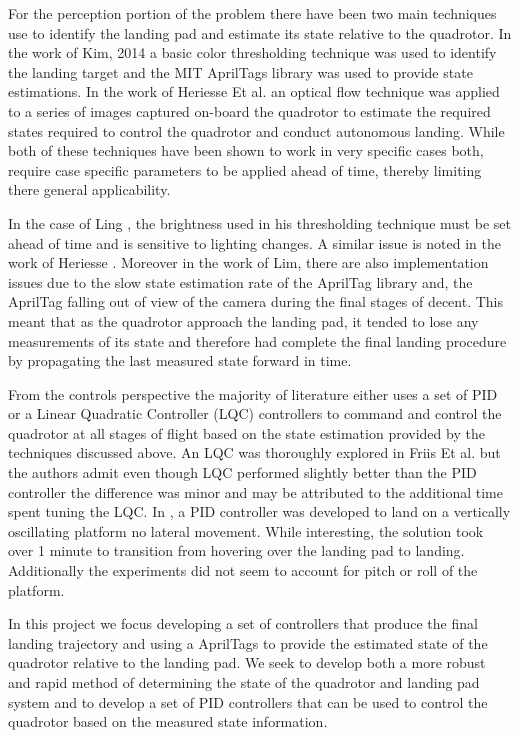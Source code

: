 \documentclass[11pt, twocolumn]{article}
\begin{document}
For the perception portion of the problem there have been two main techniques use to identify the landing pad and estimate its state relative to the quadrotor. In the work of Kim, 2014 \cite{Kim2014} a basic color thresholding technique was used to identify the landing target and the MIT AprilTags library \cite{apriltags} was used to provide state estimations. In the work of Heriesse Et al. \cite{Herisse2012} an optical flow technique was applied to a series of images captured on-board the quadrotor to estimate the required states required to control the quadrotor and conduct autonomous landing. While both of these techniques have been shown to work in very specific cases both, require case specific parameters to be applied ahead of time, thereby limiting there general applicability. 

In the case of Ling \cite{Kim2014}, the brightness used in his thresholding technique must be set ahead of time and is sensitive to lighting changes. A similar issue is noted in the work of Heriesse \cite{Herisse2012}. Moreover in the work of Lim, there are also implementation issues due to the slow state estimation rate of the AprilTag library and, the AprilTag falling out of view of the camera during the final stages of decent. This meant that as the quadrotor approach the landing pad, it tended to lose any measurements of its state and therefore had complete the final landing procedure by propagating the last measured state forward in time. 

From the controls perspective the majority of literature either uses a set of PID or a Linear Quadratic Controller (LQC) controllers to command and control the quadrotor at all stages of flight based on the state estimation provided by the techniques discussed above. An LQC was thoroughly explored in Friis Et al. \cite{Friis2009} but the authors admit even though LQC performed slightly better than the PID controller the difference was minor and may be attributed to the additional time spent tuning the LQC. In \cite{Herisse2012}, a PID controller was developed to land on a vertically oscillating platform no lateral movement. While interesting, the solution took over 1 minute to transition from hovering over the landing pad to landing. Additionally the experiments did not seem to account for pitch or roll of the platform. 

In this project we focus developing a set of controllers that produce the final landing trajectory and using a  AprilTags \cite{apriltags} to provide the estimated state of the quadrotor relative to the landing pad. We seek to develop both a more robust and rapid method of determining the state of the quadrotor and landing pad system and to develop a set of PID controllers that can be used to control the quadrotor based on the measured state information.
\end{document}
